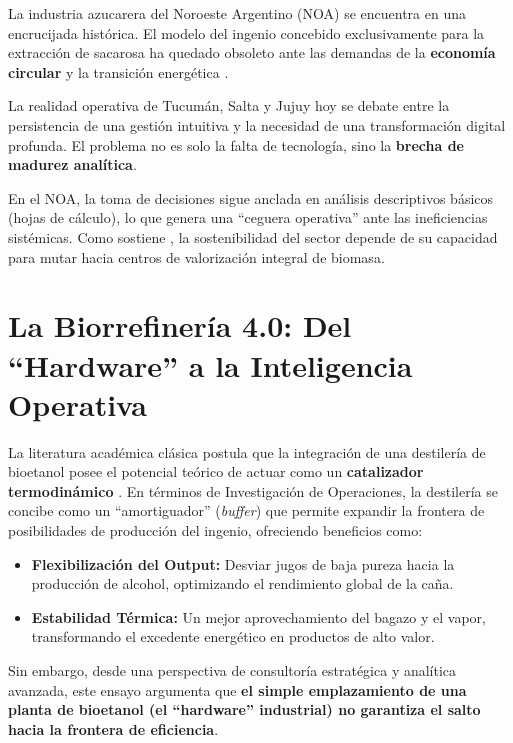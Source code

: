 \documentclass[
  spanish]{cyta}
\providecommand{\tightlist}{%
  \setlength{\itemsep}{0pt}\setlength{\parskip}{0pt}}
\begin{document}
La industria azucarera del Noroeste Argentino (NOA) se encuentra en una
encrucijada histórica. El modelo del ingenio concebido exclusivamente
para la extracción de sacarosa ha quedado obsoleto ante las demandas de
la \textbf{economía circular} y la transición energética
\citep{dessbesell2017}.

La realidad operativa de Tucumán, Salta y Jujuy hoy se debate entre la
persistencia de una gestión intuitiva y la necesidad de una
transformación digital profunda. El problema no es solo la falta de
tecnología, sino la \textbf{brecha de madurez analítica}.

En el NOA, la toma de decisiones sigue anclada en análisis descriptivos
básicos (hojas de cálculo), lo que genera una ``ceguera operativa'' ante
las ineficiencias sistémicas. Como sostiene \citep{anino2018}, la
sostenibilidad del sector depende de su capacidad para mutar hacia
centros de valorización integral de biomasa.

\section{La Biorrefinería 4.0: Del ``Hardware'' a la Inteligencia
Operativa}\label{la-biorrefineruxeda-4.0-del-hardware-a-la-inteligencia-operativa}

La literatura académica clásica postula que la integración de una
destilería de bioetanol posee el potencial teórico de actuar como un
\textbf{catalizador termodinámico} \citep{bonomi2011}. En términos de
Investigación de Operaciones, la destilería se concibe como un
``amortiguador'' (\emph{buffer}) que permite expandir la frontera de
posibilidades de producción del ingenio, ofreciendo beneficios como:

\begin{itemize}
\tightlist
\item
  \textbf{Flexibilización del Output:} Desviar jugos de baja pureza
  hacia la producción de alcohol, optimizando el rendimiento global de
  la caña.
\item
  \textbf{Estabilidad Térmica:} Un mejor aprovechamiento del bagazo y el
  vapor, transformando el excedente energético en productos de alto
  valor.
\end{itemize}

Sin embargo, desde una perspectiva de consultoría estratégica y
analítica avanzada, este ensayo argumenta que \textbf{el simple
emplazamiento de una planta de bioetanol (el ``hardware'' industrial) no
garantiza el salto hacia la frontera de eficiencia}.
\end{document}
